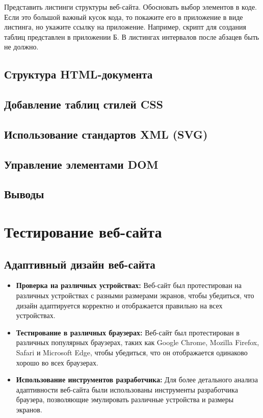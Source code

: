\documentclass{article}
\begin{document}
    Представить листинги структуры веб-сайта. Обосновать выбор элементов в коде. 
    Если это большой важный кусок кода, то покажите его в приложение в виде листинга, но укажите ссылку на приложение. Например, скрипт для создания таблиц представлен в приложении Б. В листингах интервалов после абзацев быть не должно.
    \subsection{Структура HTML-документа}
    \subsection{Добавление таблиц стилей CSS}
    \subsection{Использование стандартов XML (SVG)}
    \subsection{Управление элементами DOM}
    \subsection{Выводы}





    \section{Тестирование веб-сайта}

    \subsection{Адаптивный дизайн веб-сайта}

    \begin{itemize}
        \item \textbf{Проверка на различных устройствах:}
        Веб-сайт был протестирован на различных устройствах с разными размерами экранов, чтобы убедиться, что дизайн адаптируется корректно и отображается правильно на всех устройствах.
        
        \item \textbf{Тестирование в различных браузерах:}
        Веб-сайт был протестирован в различных популярных браузерах, таких как Google Chrome, Mozilla Firefox, Safari и Microsoft Edge, чтобы убедиться, что он отображается одинаково хорошо во всех браузерах.
        
        \item \textbf{Использование инструментов разработчика:}
        Для более детального анализа адаптивности веб-сайта были использованы инструменты разработчика браузера, позволяющие эмулировать различные устройства и размеры экранов.
        
    \end{itemize}
    
\end{document}
